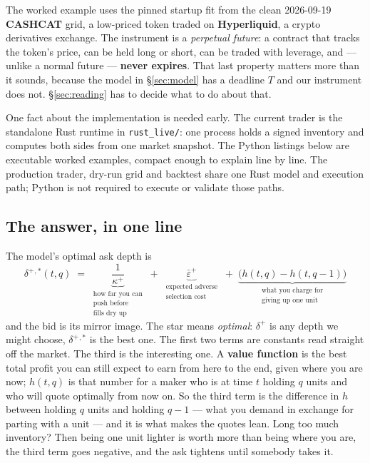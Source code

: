 \documentclass[11pt,a4paper]{article}
\newcommand{\dplus}{\delta^{+}}
\newcommand{\epsb}{\bar{\varepsilon}}
\newcommand{\code}[1]{\texttt{\small #1}}
\begin{document}
The worked example uses the pinned startup fit from the clean 2026-09-19
\textbf{CASHCAT} grid, a low-priced token
traded on \textbf{Hyperliquid}, a crypto derivatives exchange. The instrument is a
\emph{perpetual future}: a contract that tracks the token's price, can be held
long or short, can be traded with leverage, and --- unlike a normal future ---
\textbf{never expires}. That last property matters more than it sounds, because
the model in \S\ref{sec:model} has a deadline $T$ and our instrument does not.
\S\ref{sec:reading} has to decide what to do about that.

One fact about the implementation is needed early. The current trader is the
standalone Rust runtime in \code{rust\_live/}: one process holds a signed
inventory and computes both sides from one market snapshot. The Python listings
below are executable worked examples, compact enough to explain line by line.
The production trader, dry-run grid and backtest share one Rust model and
execution path; Python is not required to execute or validate those paths.

\subsection{The answer, in one line}

The model's optimal ask depth is
\[
  \dplus{}^{,*}(t,q) \;=\;
  \underbrace{\frac{1}{\kappa^{+}}}_{\substack{\text{how far you can}\\\text{push before}\\\text{fills dry up}}}
  \;+\;
  \underbrace{\epsb^{+}}_{\substack{\text{expected adverse}\\\text{selection cost}}}
  \;+\;
  \underbrace{\bigl(h(t,q) - h(t,q-1)\bigr)}_{\substack{\text{what you charge for}\\\text{giving up one unit}}}
\]
and the bid is its mirror image. The star means \emph{optimal}: $\dplus$ is any
depth we might choose, $\dplus{}^{,*}$ is the best one. The first two terms are
constants read straight off the market. The third is the interesting one. A \textbf{value function} is
the best total profit you can still expect to earn from here to the end, given
where you are now; $h(t,q)$ is that number for a maker who is at time $t$
holding $q$ units and who will quote optimally from now on. So the third term is
the difference in $h$ between holding $q$ units and holding $q-1$ --- what
you demand in exchange for parting with a unit --- and it is what makes the
quotes lean. Long too much inventory? Then being one unit lighter is worth more
than being where you are, the third term goes negative, and the ask tightens
until somebody takes it.
\end{document}
